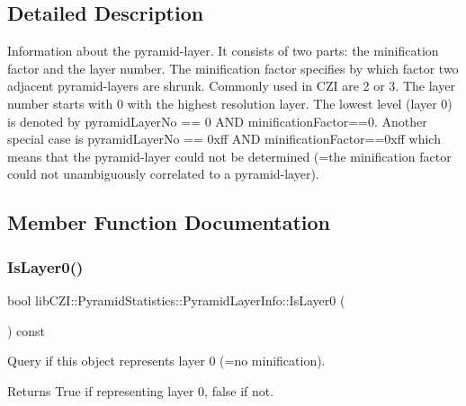 \subsection{Detailed Description}
Information about the pyramid-\/layer. It consists of two parts\+: the minification factor and the layer number. The minification factor specifies by which factor two adjacent pyramid-\/layers are shrunk. Commonly used in C\+ZI are 2 or 3. The layer number starts with 0 with the highest resolution layer. The lowest level (layer 0) is denoted by pyramid\+Layer\+No == 0 A\+ND minification\+Factor==0. Another special case is pyramid\+Layer\+No == 0xff A\+ND minification\+Factor==0xff which means that the pyramid-\/layer could not be determined (=the minification factor could not unambiguously correlated to a pyramid-\/layer). 

\subsection{Member Function Documentation}
\mbox{\label{structlib_c_z_i_1_1_pyramid_statistics_1_1_pyramid_layer_info_a9cafde3541c9752058dcbeaaa73d4686}} 
\subsubsection{\texorpdfstring{Is\+Layer0()}{IsLayer0()}}
{\footnotesize\ttfamily bool lib\+C\+Z\+I\+::\+Pyramid\+Statistics\+::\+Pyramid\+Layer\+Info\+::\+Is\+Layer0 (\begin{DoxyParamCaption}{ }\end{DoxyParamCaption}) const\hspace{0.3cm}{\ttfamily [inline]}}

Query if this object represents layer 0 (=no minification).

\begin{DoxyReturn}{Returns}
True if representing layer 0, false if not. 
\end{DoxyReturn}
\mbox{\label{structlib_c_z_i_1_1_pyramid_statistics_1_1_pyramid_layer_info_afc9992be68effd61fa8ff828c3fe467d}} 
